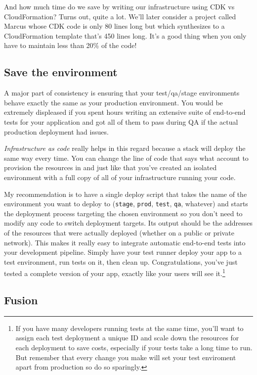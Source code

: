 \documentclass{article}
\newcommand{\noterm}[1]{\textit{#1}}
\newcommand{\term}[1]{\noterm{#1}\index{#1}}
\begin{document}
And how much time do we save by writing our infrastructure using CDK vs CloudFormation?
Turns out, quite a lot.
We'll later consider a project called Marcus whose CDK code is only 80 lines long but which synthesizes to a CloudFormation template that's 450 lines long.
It's a good thing when you only have to maintain less than 20\% of the code!

\subsection{Save the environment}

A major part of consistency is ensuring that your test/qa/stage environments behave exactly the same as your production environment.
You would be extremely displeased if you spent hours writing an extensive suite of end-to-end tests for your application and got all of them to pass during QA if the actual production deployment had issues.

\term{Infrastructure as code} really helps in this regard because a stack will deploy the same way every time.
You can change the line of code that says what account to provision the resources in and just like that you've created an isolated environment with a full copy of all of your infrastructure running your code.

My recommendation is to have a single deploy script that takes the name of the environment you want to deploy to (\texttt{stage}, \texttt{prod}, \texttt{test}, \texttt{qa}, whatever) and starts the deployment process targeting the chosen environment so you don't need to modify any code to switch deployment targets.
Its output should be the addresses of the resources that were actually deployed (whether on a public or private network).
This makes it really easy to integrate automatic end-to-end tests into your development pipeline.
Simply have your test runner deploy your app to a test environment, run tests on it, then clean up.
Congratulations, you've just tested a complete version of your app, exactly like your users will see it.\footnote{
  If you have many developers running tests at the same time, you'll want to assign each test deployment a unique ID and scale down the resources for each deployment to save costs, especially if your tests take a long time to run.
  But remember that every change you make will set your test enviroment apart from production so do so sparingly.
}

\subsection{Fusion}
\end{document}
